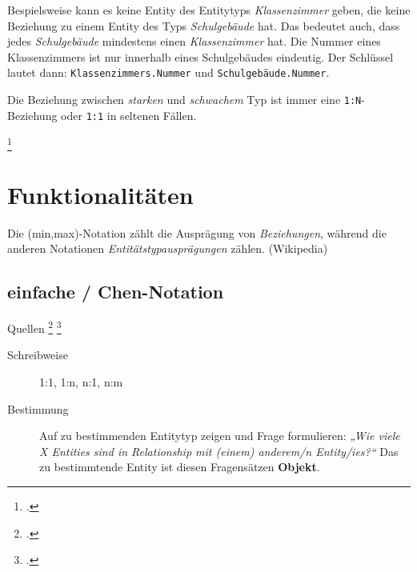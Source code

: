 \documentclass{bschlangaul-theorie}
\begin{document}
Bespielsweise  kann es keine Entity des Entitytyps \emph{Klassenzimmer}
geben, die keine Beziehung zu einem Entity des Typs \emph{Schulgebäude}
hat. Das bedeutet auch, dass jedes \emph{Schulgebäude} mindestens einen
\emph{Klassenzimmer} hat. Die Nummer eines Klassenzimmers ist nur
innerhalb eines Schulgebäudes eindeutig. Der Schlüssel lautet dann:
\texttt{Klassenzimmers.Nummer} und \texttt{Schulgebäude.Nummer}.

Die Beziehung zwischen \emph{starken} und \emph{schwachem} Typ ist immer
eine \texttt{1:N}-Bezieh\-ung oder \texttt{1:1} in seltenen Fällen.

\footcite[Seite 26]{db:fs:1}

\begin{center}
\end{center}

%

\section{Funktionalitäten}

Die (min,max)-Notation zählt die Ausprägung von \emph{Beziehungen},
während die anderen Notationen \emph{Entitätstypausprägungen} zählen.
(Wikipedia)

\subsection{einfache / Chen-Notation}

Quellen
\footcite[2.7.1 Seite 41]{kemper}
\footcite[Seite 59]{brinda}

\begin{description}
\item[Schreibweise] 1:1, 1:n, n:1, n:m
\item[Bestimmung]

Auf zu bestimmenden Entitytyp zeigen und Frage formulieren:
%
\emph{„Wie viele X Entities sind in Relationship mit (einem) anderem/n
Entity/ies?“}
%
Das zu bestimmtende Entity ist diesen Fragensätzen \textbf{Objekt}.

\end{description}
\end{document}

